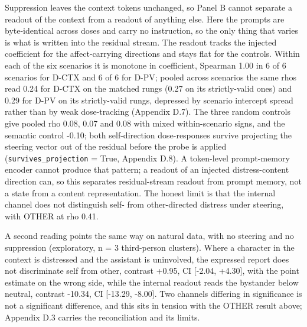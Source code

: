 \documentclass[11pt,a4paper]{article}
\newcommand{\pnum}[2]{#2}
\begin{document}
Suppression leaves the context tokens unchanged, so Panel B cannot separate a readout of the context from a readout of anything else. Here the prompts are byte-identical across doses and carry no instruction, so the only thing that varies is what is written into the residual stream. The readout tracks the injected coefficient for the affect-carrying directions and stays flat for the controls. Within each of the six scenarios it is monotone in coefficient, Spearman 1.00 in \pnum{panelA\_specificity\_by\_rung}{6} of 6 scenarios for D-CTX and 6 of 6 for D-PV; pooled across scenarios the same rhos read \pnum{panelAp\_internal\_specificity}{0.24} for D-CTX on the matched rungs (0.27 on its strictly-valid ones) and 0.29 for D-PV on its strictly-valid rungs, depressed by scenario intercept spread rather than by weak dose-tracking (Appendix D.7). The three random controls give pooled rho 0.08, 0.07 and 0.08 with mixed within-scenario signs, and the semantic control -0.10; both self-direction dose-responses survive projecting the steering vector out of the residual before the probe is applied (\texttt{survives\_projection} = \pnum{panelAp\_projout\_check}{True}, Appendix D.8). A token-level prompt-memory encoder cannot produce that pattern; a readout of an injected distress-content direction can, so this separates residual-stream readout from prompt memory, not a state from a content representation. The honest limit is that the internal channel does not distinguish self- from other-directed distress under steering, with OTHER at rho 0.41.

A second reading points the same way on natural data, with no steering and no suppression (exploratory, n = \pnum{panelB\_selfother\_report}{3} third-person clusters). Where a character in the context is distressed and the assistant is uninvolved, the expressed report does not discriminate self from other, contrast +0.95, CI [-2.04, +4.30], with the point estimate on the wrong side, while the internal readout reads the bystander below neutral, contrast \pnum{panelB\_selfother\_internal}{-10.34}, CI [-13.29, -8.00]. Two channels differing in significance is not a significant difference, and this sits in tension with the OTHER result above; Appendix D.3 carries the reconciliation and its limits.
\end{document}
